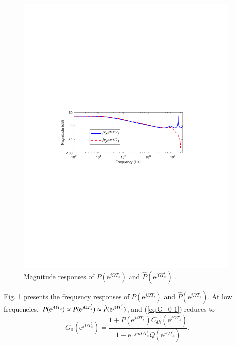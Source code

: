 \documentclass [11pt, proquest] {uwthesis}[2020/02/24]
\begin{document}
\begin{figure}[!ht]
\begin{centering}
\includegraphics[width=11cm]{Fractional-order-RC/P_Ts_P_Ts_prime}
\par\end{centering}
\caption{\label{fig:The-relationship-between-1}Magnitude responses of $P(\text{e}^{j\Omega T_{s}})$
and $\hat{P}(\text{e}^{j\Omega T_{s}^{'}})$ .}
\end{figure}
Fig. \ref{fig:The-relationship-between-1} presents the frequency
responses of $P(\text{e}^{j\Omega T_{s}})$ and $\hat{P}(\text{e}^{j\Omega T_{s}^{'}}).$
At low frequencies, $P(\text{e}^{j\Omega T_{s}})\thickapprox P(\text{e}^{j\Omega T_{s}^{'}})\thickapprox\hat{P}(\text{e}^{j\Omega T_{s}^{'}})$,
and (\ref{eq:G_0-1}) reduces to
\begin{equation}
G_{0}(\text{e}^{j\Omega T_{s}^{'}})=\frac{1+P(\text{e}^{j\Omega T_{s}})C_{dh}(\text{e}^{j\Omega T_{s}^{'}})}{1-\text{e}^{-jm\Omega T_{s}^{'}}Q(\text{e}^{j\Omega T_{s}^{'}})}.\label{eq:G_0_low}
\end{equation}
\end{document}
